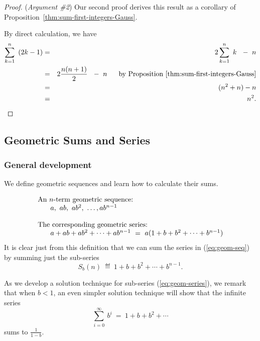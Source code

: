 \medskip

\begin{proof}
({\it Argument \#2})
%
Our second proof derives this result as a corollary of
Proposition~\ref{thm:sum-first-integers-Gauss}.

By direct calculation, we have
\begin{eqnarray*}
\sum_{k=1}^n \ \left( 2k-1 \right)
   & = & 2 \sum_{k=1}^n \ k \ \ - \ n \\
   & = & 2 \frac{n (n+1)}{2} \ \ - \ n \ \ \ \ \mbox{ by
  Proposition~\ref{thm:sum-first-integers-Gauss}} \\
   & = & (n^2 + n) - n \\
   & = & n^2.
\end{eqnarray*}
\end{proof}


\subsection{Geometric Sums and Series}
\label{sec:geometric-sums}

\subsubsection{General development}
\label{sec:general-geometric}

We define geometric sequences and learn how to calculate their sums.

\begin{equation}
\label{eq:geom-seq}
\begin{array}{l}
\mbox{An $n$-term geometric sequence:} \\
\hspace*{.25in}a, \ ab, \ ab^2, \ \ldots, ab^{n-1} \\
\\
\mbox{The corresponding geometric series:} \\
\hspace*{.25in}a + ab + ab^2 + \cdots + ab^{n-1} \ = \
 a (1+ b + b^2 + \cdots + b^{n-1})
\end{array}
\end{equation}
It is clear just from this definition that we can sum the series in
(\ref{eq:geom-seq}) by summing just the sub-series
\begin{equation}
\label{eq:geom-series}
S_{b}(n) \ \eqdef \
1+ b + b^2 + \cdots + b^{n-1}.
\end{equation}

As we develop a solution technique for sub-series
(\ref{eq:geom-series}), we remark that when $b < 1$, an even simpler
solution technique will show that the infinite series
\[ \sum_{i=0}^\infty \ b^i \ = \ 1 + b + b^2 + \cdots \]
sums to $\displaystyle \frac{1}{1-b}$.

